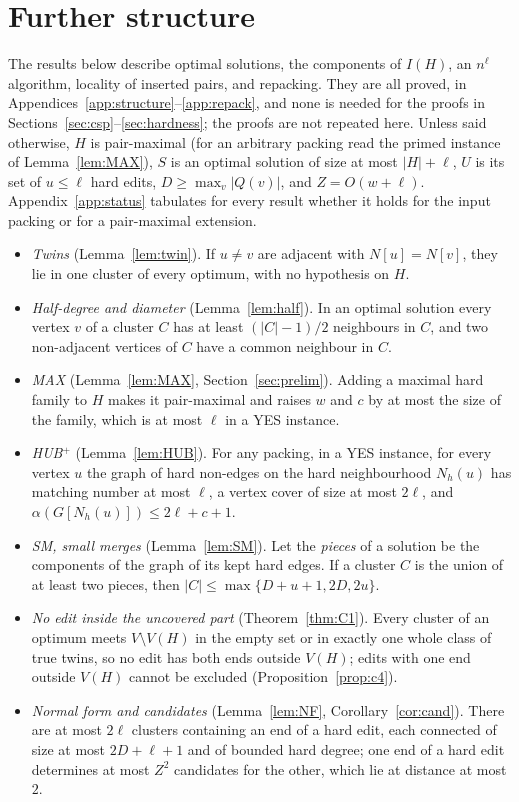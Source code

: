 \section{Further structure}\label{sec:further}
The results below describe optimal solutions, the components of $I(H)$, an $n^{\ell}$ algorithm, locality of inserted pairs, and repacking. They are all proved, in Appendices~\ref{app:structure}--\ref{app:repack}, and none is needed for the proofs in Sections~\ref{sec:csp}--\ref{sec:hardness}; the proofs are not repeated here. Unless said otherwise, $H$ is pair-maximal (for an arbitrary packing read the primed instance of Lemma~\ref{lem:MAX}), $S$ is an optimal solution of size at most $|H|+\ell$, $U$ is its set of $u\le\ell$ hard edits, $D\ge\max_v|Q(v)|$, and $Z=O(w+\ell)$. Appendix~\ref{app:status} tabulates for every result whether it holds for the input packing or for a pair-maximal extension.

\begin{itemize}
\item \emph{Twins} (Lemma~\ref{lem:twin}). If $u\ne v$ are adjacent with $N[u]=N[v]$, they lie in one cluster of every optimum, with no hypothesis on $H$.
\item \emph{Half-degree and diameter} (Lemma~\ref{lem:half}). In an optimal solution every vertex $v$ of a cluster $C$ has at least $(|C|-1)/2$ neighbours in $C$, and two non-adjacent vertices of $C$ have a common neighbour in $C$.
\item \emph{MAX} (Lemma~\ref{lem:MAX}, Section~\ref{sec:prelim}). Adding a maximal hard family to $H$ makes it pair-maximal and raises $w$ and $c$ by at most the size of the family, which is at most $\ell$ in a YES instance.
\item \emph{HUB$^+$} (Lemma~\ref{lem:HUB}). For any packing, in a YES instance, for every vertex $u$ the graph of hard non-edges on the hard neighbourhood $N_h(u)$ has matching number at most $\ell$, a vertex cover of size at most $2\ell$, and $\alpha(G[N_h(u)])\le2\ell+c+1$.
\item \emph{SM, small merges} (Lemma~\ref{lem:SM}). Let the \emph{pieces} of a solution be the components of the graph of its kept hard edges. If a cluster $C$ is the union of at least two pieces, then $|C|\le\max\{D+u+1,2D,2u\}$.
\item \emph{No edit inside the uncovered part} (Theorem~\ref{thm:C1}). Every cluster of an optimum meets $V\setminus V(H)$ in the empty set or in exactly one whole class of true twins, so no edit has both ends outside $V(H)$; edits with one end outside $V(H)$ cannot be excluded (Proposition~\ref{prop:c4}).
\item \emph{Normal form and candidates} (Lemma~\ref{lem:NF}, Corollary~\ref{cor:cand}). There are at most $2\ell$ clusters containing an end of a hard edit, each connected of size at most $2D+\ell+1$ and of bounded hard degree; one end of a hard edit determines at most $Z^2$ candidates for the other, which lie at distance at most $2$.
\end{itemize}

